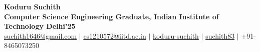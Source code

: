 \documentclass[9pt,a4paper]{extarticle}
\begin{document}
\begin{flushleft}
{\Huge\textbf{Koduru Suchith}} \\
\vspace{2pt} %
\large\textbf{Computer Science Engineering Graduate, Indian Institute of Technology Delhi'25} \\
\vspace{4pt} %
\faEnvelope \hspace{1pt} \href{mailto:suchith1646@gmail.com}{suchith1646@gmail.com} \hspace{4pt}\(|\)\hspace{4pt}
\faEnvelope \hspace{1pt} \href{mailto:cs1210572@iitd.ac.in}{cs1210572@iitd.ac.in} \hspace{4pt}\(|\)\hspace{4pt}
\faLinkedinSquare \hspace{1pt} \href{https://www.linkedin.com/in/suchith-koduru-34966022b/}{koduru-suchith} \hspace{4pt}\(|\)\hspace{4pt}
\faGithub \hspace{1pt} \href{https://github.com/suchith83}{suchith83} \hspace{4pt}\(|\)\hspace{4pt}
\faPhone \hspace{1pt} +91-8465073250
\end{flushleft}

\vspace{-0.3cm}

\end{document}
